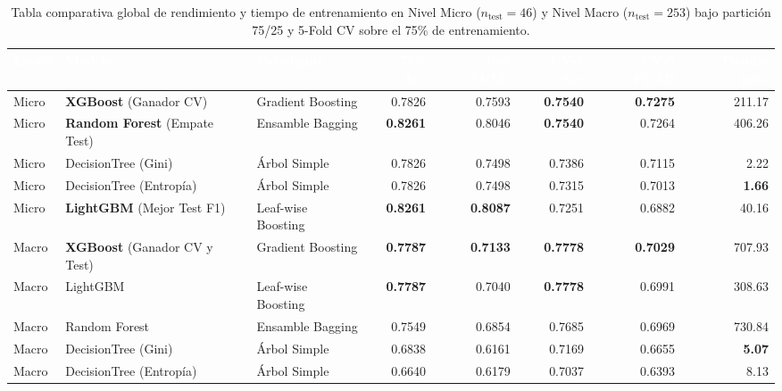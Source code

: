 \documentclass[11pt,a4paper]{article}
\begin{document}
\begin{table}[H]
    \centering
    \caption{Tabla comparativa global de rendimiento y tiempo de entrenamiento en Nivel Micro ($n_{\text{test}}=46$) y Nivel Macro ($n_{\text{test}}=253$) bajo partición 75/25 y 5-Fold CV sobre el 75\% de entrenamiento.}
    \label{tab:comparativa_global}
    \setlength{\tabcolsep}{4pt}
    \footnotesize
    \begin{adjustbox}{max width=\textwidth}
    \begin{tabular}{lllrrrrr}
        \toprule
        \rowcolor{verdeHeader}
        \textcolor{white}{\textbf{Escala}} & \textcolor{white}{\textbf{Modelo}} & \textcolor{white}{\textbf{Paradigma}} & \textcolor{white}{\textbf{Test Acc}} & \textcolor{white}{\textbf{Test F1(M)}} & \textcolor{white}{\textbf{CV-5 Acc}} & \textcolor{white}{\textbf{CV-5 F1(M)}} & \textcolor{white}{\textbf{Tiempo (ms)}} \\
        \midrule
        \rowcolor{azulSuave!65}
        Micro & \textbf{XGBoost} (Ganador CV) & Gradient Boosting & 0.7826 & 0.7593 & \textbf{0.7540} & \textbf{0.7275} & 211.17 \\
        Micro & \textbf{Random Forest} (Empate Test) & Ensamble Bagging & \textbf{0.8261} & 0.8046 & \textbf{0.7540} & 0.7264 & 406.26 \\
        Micro & DecisionTree (Gini) & Árbol Simple & 0.7826 & 0.7498 & 0.7386 & 0.7115 & 2.22 \\
        Micro & DecisionTree (Entropía) & Árbol Simple & 0.7826 & 0.7498 & 0.7315 & 0.7013 & \textbf{1.66} \\
        Micro & \textbf{LightGBM} (Mejor Test F1) & Leaf-wise Boosting & \textbf{0.8261} & \textbf{0.8087} & 0.7251 & 0.6882 & 40.16 \\
        \midrule
        \rowcolor{azulSuave!65}
        Macro & \textbf{XGBoost} (Ganador CV y Test) & Gradient Boosting & \textbf{0.7787} & \textbf{0.7133} & \textbf{0.7778} & \textbf{0.7029} & 707.93 \\
        Macro & LightGBM & Leaf-wise Boosting & \textbf{0.7787} & 0.7040 & \textbf{0.7778} & 0.6991 & 308.63 \\
        Macro & Random Forest & Ensamble Bagging & 0.7549 & 0.6854 & 0.7685 & 0.6969 & 730.84 \\
        Macro & DecisionTree (Gini) & Árbol Simple & 0.6838 & 0.6161 & 0.7169 & 0.6655 & \textbf{5.07} \\
        Macro & DecisionTree (Entropía) & Árbol Simple & 0.6640 & 0.6179 & 0.7037 & 0.6393 & 8.13 \\
        \bottomrule
    \end{tabular}
    \end{adjustbox}
\end{table}
\end{document}
